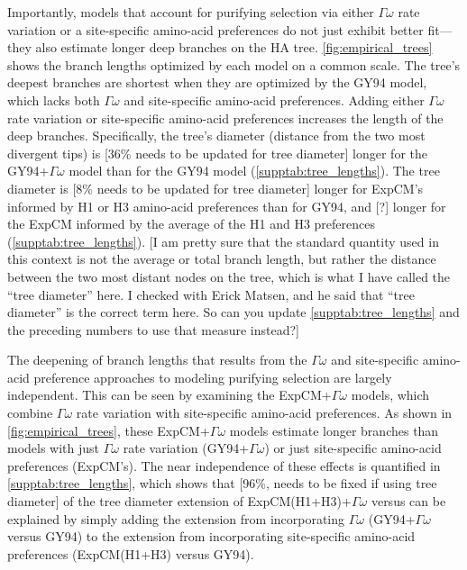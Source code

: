 \documentclass[11pt]{article}
\newcommand\jdbcomment[1]{{\color{red}[#1]}}
\begin{document}
Importantly, models that account for purifying selection via either $\Gamma\omega$ rate variation or a site-specific amino-acid preferences do not just exhibit better fit---they also estimate longer deep branches on the HA tree. 
\ref{fig:empirical_trees} shows the branch lengths optimized by each model on a common scale.
The tree's deepest branches are shortest when they are optimized by the GY94 model, which lacks both $\Gamma\omega$ and site-specific amino-acid preferences.
Adding either $\Gamma\omega$ rate variation or site-specific amino-acid preferences increases the length of the deep branches.
Specifically, the tree's diameter (distance from the two most divergent tips) is \jdbcomment{36\% needs to be updated for tree diameter} longer for the GY94+$\Gamma\omega$ model than for the GY94 model (\ref{supptab:tree_lengths}).
The tree diameter is \jdbcomment{8\% needs to be updated for tree diameter} longer for ExpCM's informed by H1 or H3 amino-acid preferences than for GY94, and \jdbcomment{?} longer for the ExpCM informed by the average of the H1 and H3 preferences (\ref{supptab:tree_lengths}).
\jdbcomment{I am pretty sure that the standard quantity used in this context is not the average or total branch length, but rather the distance between the two most distant nodes on the tree, which is what I have called the ``tree diameter'' here.
I checked with Erick Matsen, and he said that ``tree diameter'' is the correct term here.
So can you update \ref{supptab:tree_lengths} and the preceding numbers to use that measure instead?}

The deepening of branch lengths that results from the $\Gamma\omega$ and site-specific amino-acid preference approaches to modeling purifying selection are largely independent.
This can be seen by examining the ExpCM+$\Gamma\omega$ models, which combine $\Gamma\omega$ rate variation with site-specific amino-acid preferences.
As shown in \ref{fig:empirical_trees}, these ExpCM+$\Gamma\omega$ models estimate longer branches than models with just $\Gamma\omega$ rate variation (GY94+$\Gamma\omega$) or just site-specific amino-acid preferences (ExpCM's).
The near independence of these effects is quantified in \ref{supptab:tree_lengths}, which shows that \jdbcomment{96\%, needs to be fixed if using tree diameter} of the tree diameter extension of ExpCM(H1+H3)+$\Gamma\omega$ versus can be explained by simply adding the extension from incorporating $\Gamma\omega$ (GY94+$\Gamma\omega$ versus GY94) to the extension from incorporating site-specific amino-acid preferences (ExpCM(H1+H3) versus GY94).
\end{document}
